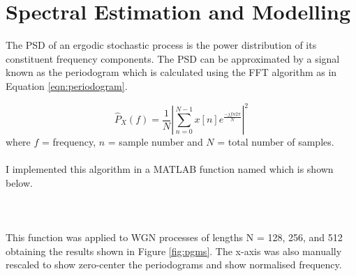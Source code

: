 
\section{Spectral Estimation and Modelling}


The PSD of an ergodic stochastic process  is the power distribution of its constituent frequency components. The PSD can be approximated by a signal known as the periodogram which is calculated using the FFT algorithm as in Equation \ref{eqn:periodogram}.

\begin{equation}
\hat{P}_{X}(f)=\frac{1}{N}\left|\sum_{n=0}^{N-1} x[n] e^{\frac{-j f n 2 \pi}{N}}\right|^{2}
\label{eqn:periodogram}
\end{equation}
\noindent
where $f$ = frequency, $n$ = sample number and $N$ = total number of samples.
\\\\
I implemented this algorithm in a MATLAB function named  which is shown below.
\\\\
\noindent
{}
\\\\
\noindent
This function was applied to WGN processes of lengths N = 128, 256, and 512 obtaining the results shown in Figure \ref{fig:pgms}. The x-axis was also manually rescaled to show zero-center the periodograms and show normalised frequency.

